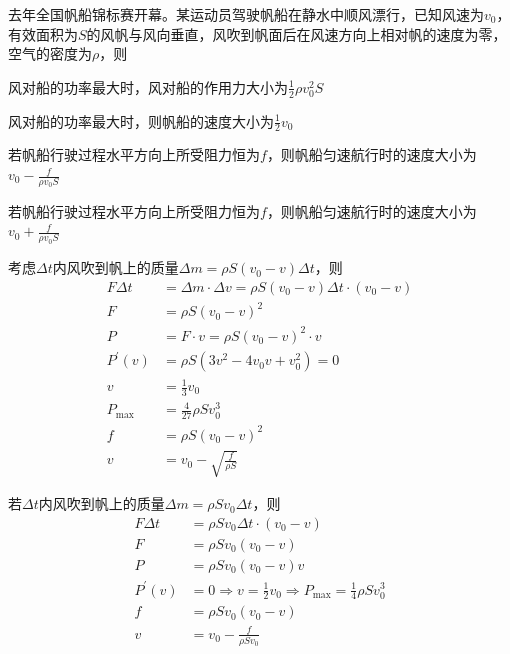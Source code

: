 去年全国帆船锦标赛开幕。某运动员驾驶帆船在静水中顺风漂行，已知风速为\(v_0\)，有效面积为\(S\)的风帆与风向垂直，风吹到帆面后在风速方向上相对帆的速度为零，空气的密度为\(\rho\)，则
\begin{choices}
	\item 风对船的功率最大时，风对船的作用力大小为\(\frac{1}{2} \rho v_0^2 S\)
	\item 风对船的功率最大时，则帆船的速度大小为\(\frac{1}{2} v_0\)
	\item 若帆船行驶过程水平方向上所受阻力恒为\(f\)，则帆船匀速航行时的速度大小为\(v_0 - \frac{f}{\rho v_0 S}\)
	\item 若帆船行驶过程水平方向上所受阻力恒为\(f\)，则帆船匀速航行时的速度大小为\(v_0 + \frac{f}{\rho v_0 S}\)
\end{choices}
\begin{answer}
	考虑\(\Delta t\)内风吹到帆上的质量\(\Delta m =\rho S(v_0 - v)\Delta t\)，则
   \[
	\begin{aligned}
		F\Delta t &=\Delta m\cdot \Delta v =\rho S(v_0 - v)\Delta t\cdot (v_0 - v)\\
		F&=\rho S(v_0 - v)^2\\
		P&= F\cdot v =\rho S(v_0 - v)^2\cdot v\\
		P^{\prime}(v)&=\rho S(3v^2 - 4v_0v + v_0^2) = 0\\
		v&= \frac{1}{3}v_0\\
		P_{\max}&= \frac{4}{27}\rho Sv_0^3\\
		f&=\rho S (v_0 - v)^2\\
		v&= v_0 - \sqrt{\frac{f}{\rho S}}
	\end{aligned}
   \] 

   若\(\Delta t\)内风吹到帆上的质量\(\Delta m =\rho Sv_0\Delta t\)，则
   \[
	\begin{aligned}
		F\Delta t&=\rho Sv_0\Delta t\cdot (v_0 - v)\\
		F&=\rho Sv_0(v_0 - v)\\
		P&=\rho Sv_0(v_0 - v)v\\
		P^{\prime}(v)&= 0\Rightarrow v = \frac{1}{2}v_0\Rightarrow P_{\max} = \frac{1}{4}\rho Sv_0^3\\
		f&=\rho Sv_0(v_0 - v)\\
		v&= v_0 - \frac{f}{\rho Sv_0}
	\end{aligned}
   \]
\end{answer}